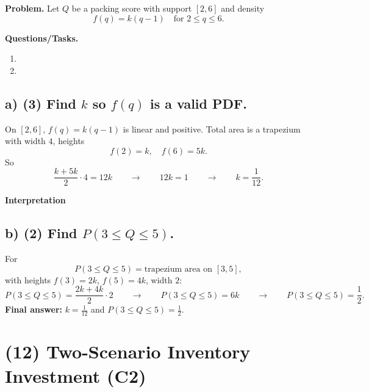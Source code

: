 \textbf{Problem.}
Let $Q$ be a packing score with support $[2,6]$ and density
\[
f(q)=k(q-1)\quad\text{for }2\le q\le 6.
\]

\textbf{Questions/Tasks.}
\begin{enumerate}[label=\textbf{\alph*)}]
	\item {}
	\item {}
\end{enumerate}


\subsection*{a) \textbf{(3)} Find $k$ so $f(q)$ is a valid PDF.}
\label{subsec:packing-score-c1-a}

On $[2,6]$, $f(q)=k(q-1)$ is linear and positive. Total area is a trapezium with width $4$, heights
\[
f(2)=k,\quad f(6)=5k.
\]
So
\[
\frac{k+5k}{2}\cdot4=12k\qquad \longrightarrow \qquad 12k=1\qquad \longrightarrow \qquad k=\frac1{12}.
\]

\textbf{Interpretation}


\subsection*{b) \textbf{(2)} Find $P(3\le Q\le 5)$.}
\label{subsec:packing-score-c1-b}
For
\[
P(3\le Q\le5)=\text{trapezium area on }[3,5],
\]
with heights $f(3)=2k$, $f(5)=4k$, width $2$:
\[
P(3\le Q\le5)=\frac{2k+4k}{2}\cdot2\qquad \longrightarrow \qquad P(3\le Q\le5)=6k\qquad \longrightarrow \qquad P(3\le Q\le5)=\frac12.
\]
\textbf{Final answer:} $k=\frac1{12}$ and $P(3\le Q\le5)=\frac12$.


\section{(12) Two-Scenario Inventory Investment (C2)}
\label{sec:two-scenario-inventory-investment-c2}


